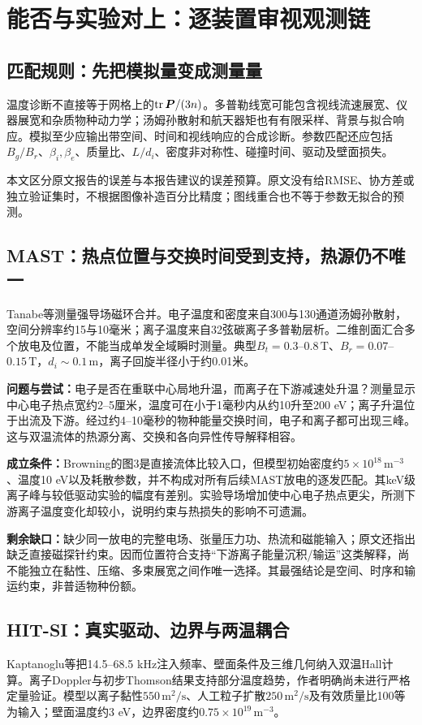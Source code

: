 \chapter{能否与实验对上：逐装置审视观测链}
\section{匹配规则：先把模拟量变成测量量}
温度诊断不直接等于网格上的$\operatorname{tr}\bm{P}/(3n)$。多普勒线宽可能包含视线流速展宽、仪器展宽和杂质物种动力学；汤姆孙散射和航天器矩也有有限采样、背景与拟合响应。模拟至少应输出带空间、时间和视线响应的合成诊断。参数匹配还应包括$B_g/B_r$、$\beta_i,\beta_e$、质量比、$L/d_i$、密度非对称性、碰撞时间、驱动及壁面损失。

本文区分原文报告的误差与本报告建议的误差预算。原文没有给RMSE、协方差或独立验证集时，不根据图像补造百分比精度；图线重合也不等于参数无拟合的预测。

\section{MAST：热点位置与交换时间受到支持，热源仍不唯一}
Tanabe等测量强导场磁环合并。电子温度和密度来自300与130通道汤姆孙散射，空间分辨率约15与10毫米；离子温度来自32弦碳离子多普勒层析。二维剖面汇合多个放电及位置，不能当成单发全域瞬时测量。典型$B_t=0.3$--$0.8\,\mathrm T$、$B_r=0.07$--$0.15\,\mathrm T$，$d_i\sim0.1\,\mathrm m$，离子回旋半径小于约0.01米。\citep{Tanabe2015MAST}

\textbf{问题与尝试：}电子是否在重联中心局地升温，而离子在下游减速处升温？测量显示中心电子热点宽约2--5厘米，温度可在小于1毫秒内从约10升至200 eV；离子升温位于出流及下游。经过约4--10毫秒的物种能量交换时间，电子和离子都可出现三峰。这与双温流体的热源分离、交换和各向异性传导解释相容。

\textbf{成立条件：}Browning的图3是直接流体比较入口，但模型初始密度约$5\times10^{18}\,\mathrm{m^{-3}}$、温度10 eV以及耗散参数，并不构成对所有后续MAST放电的逐发匹配。其keV级离子峰与较低驱动实验的幅度有差别。实验导场增加使中心电子热点更尖，所测下游离子温度变化却较小，说明约束与热损失的影响不可遗漏。\citep{L223}

\textbf{剩余缺口：}缺少同一放电的完整电场、张量压力功、热流和磁能输入；原文还指出缺乏直接磁探针约束。因而位置符合支持“下游离子能量沉积/输运”这类解释，尚不能独立在黏性、压缩、多束展宽之间作唯一选择。其最强结论是空间、时序和输运约束，非普适物种份额。

\section{HIT-SI：真实驱动、边界与两温耦合}
Kaptanoglu等把14.5--68.5 kHz注入频率、壁面条件及三维几何纳入双温Hall计算。离子Doppler与初步Thomson结果支持部分温度趋势，作者明确尚未进行严格定量验证。模型以离子黏性$550\,\mathrm{m^2/s}$、人工粒子扩散$250\,\mathrm{m^2/s}$及有效质量比100等为输入；壁面温度约3 eV，边界密度约$0.75\times10^{19}\,\mathrm{m^{-3}}$。\citep{Kaptanoglu2020}

